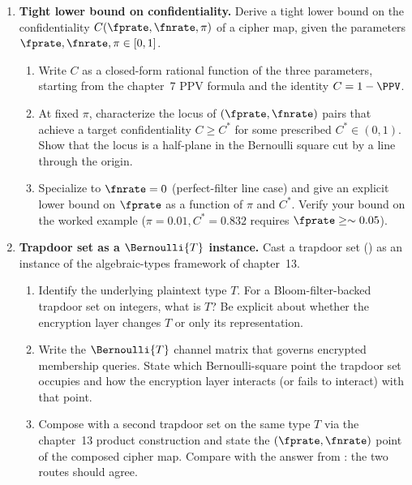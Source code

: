\begin{enumerate}

\item \exstarstarstar
\label{ex:ch17-9}
\textbf{Tight lower bound on confidentiality.}
Derive a tight lower bound on the confidentiality
$C(\fprate, \fnrate, \pi)$ of a cipher map, given the
parameters $\fprate, \fnrate, \pi \in [0, 1]$.
\begin{enumerate}
  \item[(a)] Write $C$ as a closed-form rational function of the
    three parameters, starting from the chapter~7 PPV formula
     and the identity $C = 1 - \PPV$.
  \item[(b)] At fixed $\pi$, characterize the locus of
    $(\fprate, \fnrate)$ pairs that achieve a target
    confidentiality $C \ge C^{*}$ for some prescribed
    $C^{*} \in (0, 1)$. Show that the locus is a half-plane
    in the Bernoulli square cut by a line through the origin.
  \item[(c)] Specialize to $\fnrate = 0$ (perfect-filter line
    case) and give an explicit lower bound on $\fprate$ as a
    function of $\pi$ and $C^{*}$. Verify your bound on the
     worked example
    ($\pi = 0.01, C^{*} = 0.832$ requires
    $\fprate \ge \sim 0.05$).
\end{enumerate}

\item \exstarstarstar
\label{ex:ch17-10}
\textbf{Trapdoor set as a $\Bernoulli{T}$ instance.}
Cast a trapdoor set () as an instance of
the algebraic-types framework of chapter~13.
\begin{enumerate}
  \item[(a)] Identify the underlying plaintext type $T$. For a
    Bloom-filter-backed trapdoor set on integers, what is
    $T$? Be explicit about whether the encryption layer
    changes $T$ or only its representation.
  \item[(b)] Write the $\Bernoulli{T}$ channel matrix that
    governs encrypted membership queries. State which
    Bernoulli-square point the trapdoor set occupies and how
    the encryption layer interacts (or fails to interact) with
    that point.
  \item[(c)] Compose with a second trapdoor set on the same
    type $T$ via the chapter~13 product construction and
    state the $(\fprate, \fnrate)$ point of the composed
    cipher map. Compare with the answer from
    : the two routes should
    agree.
\end{enumerate}


\end{enumerate}
